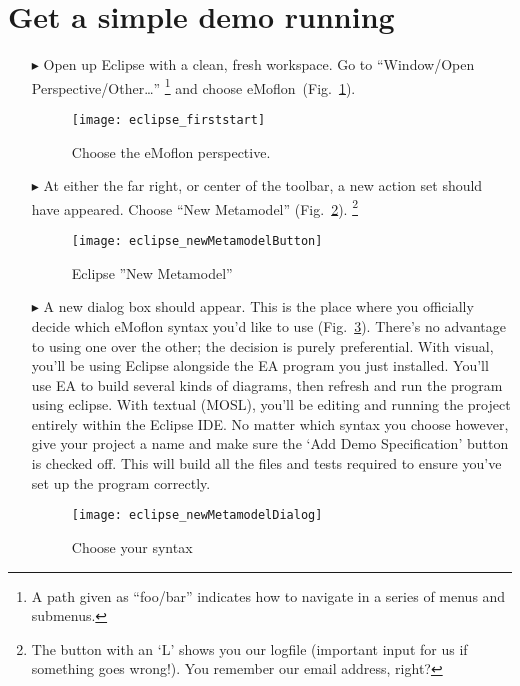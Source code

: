 \newpage
\genHeader
{}

\section{Get a simple demo running}

\begin{itemize}
\item[$\blacktriangleright$] Open\hypertarget{simpleDemo common}{} up Eclipse with a clean, fresh workspace. Go to ``Window/Open Perspective/Other\ldots'' \footnote{A path given as ``foo/bar'' indicates how to navigate in a series of menus and submenus.} and choose eMoflon~(Fig.~\ref{fig_eclipse}).

\begin{figure}[htbp]
	\centering
  \texttt{[image: eclipse\_firststart]}
	\caption{Choose the eMoflon perspective.}
	\label{fig_eclipse}
\end{figure} 

\item[$\blacktriangleright$] At either the far right, or center of the toolbar, a new action set should have appeared. Choose ``New Metamodel'' (Fig.~\ref{fig_eclipseNewMetamodelButton}).
\footnote{The button with an `L' shows you our logfile (important input for us if something goes wrong!). You remember our email address, right?}

\begin{figure}[htbp]
	\centering
  \texttt{[image: eclipse\_newMetamodelButton]}
	\caption{Eclipse ''New Metamodel''}
	\label{fig_eclipseNewMetamodelButton}
\end{figure}

\item[$\blacktriangleright$] A new dialog box should appear. This is the place where you officially decide which eMoflon syntax you'd like to use (Fig.~\ref{fig_chooseSyntax}). There's no advantage to using one over the other; the decision is purely preferential. With visual, you'll be using Eclipse alongside the EA program you just installed. You'll use EA to build several kinds of diagrams, then refresh and run the program using eclipse. With textual (MOSL), you'll be editing and running the project entirely within the Eclipse IDE. No matter which syntax you choose however, give your project a name and make sure the `Add Demo Specification' button is checked off. This will build all the files and tests required to ensure you've set up the program correctly.  

\vspace{1cm}

\begin{figure}[htbp]
	\centering
  \texttt{[image: eclipse\_newMetamodelDialog]}
	\caption{Choose your syntax}
	\label{fig_chooseSyntax}
\end{figure} 
\end{itemize}



